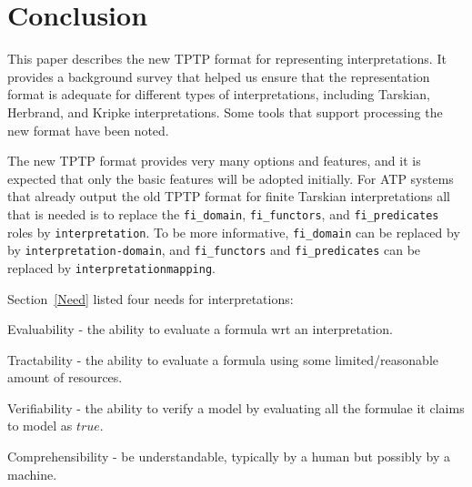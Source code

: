 \documentclass{easychair}
\newenvironment{packed_itemize}{
\vspace*{-0.3em}
\begin{itemize}
\setlength{\partopsep}{0pt}
\setlength{\itemsep}{1pt}
\setlength{\parskip}{0pt}
\setlength{\parsep}{0pt}
}{\end{itemize}}
\begin{document}
\section{Conclusion}
\label{Conclusion}

This paper describes the new TPTP format for representing interpretations.
It provides a background survey that helped us ensure that the representation format is adequate
for different types of interpretations, including Tarskian, Herbrand, and Kripke interpretations.
Some tools that support processing the new format have been noted.

The new TPTP format provides very many options and features, and it is expected that only the 
basic features will be adopted initially. 
For ATP systems that already output the old TPTP format for finite Tarskian interpretations
all that is needed is to replace the {\tt fi\_domain}, {\tt fi\_functors}, and {\tt fi\_predicates}
roles by {\tt interpretation}. 
To be more informative, {\tt fi\_domain} can be replaced by by {\tt interpretation-domain}, and 
{\tt fi\_functors} and {\tt fi\_predicates} can be replaced by {\tt interpretation\-mapping}.

Section~\ref{Need} listed four needs for interpretations: 
\begin{packed_itemize}
\item Evaluability - the ability to evaluate a formula wrt an interpretation.
\item Tractability - the ability to evaluate a formula using some limited/reasonable amount of
      resources.
\item Verifiability - the ability to verify a model by evaluating all the formulae it claims
      to model as $true$.
\item Comprehensibility - be understandable, typically by a human but possibly by a machine.
\end{packed_itemize}
\end{document}
